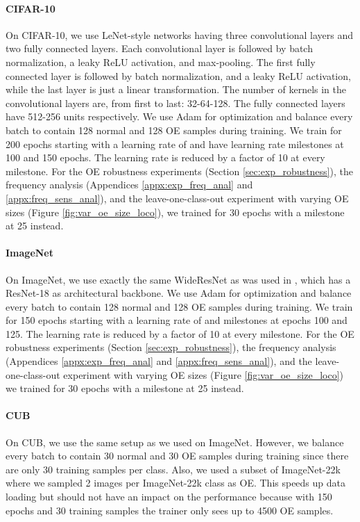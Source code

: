 \documentclass[10pt]{article} \usepackage[accepted]{stylefiles/tmlr}
\begin{document}
\paragraph{CIFAR-10}
On CIFAR-10, we use LeNet-style networks having three convolutional layers and two fully connected layers. Each convolutional layer is followed by batch normalization, a leaky ReLU activation, and max-pooling. The first fully connected layer is followed by batch normalization, and a leaky ReLU activation, while the last layer is just a linear transformation. The number of kernels in the convolutional layers are, from first to last: 32-64-128. The fully connected layers have 512-256 units respectively.
We use Adam \citep{kingma2014} for optimization and balance every batch to contain
128 normal and 128 OE samples during training.
We train for 200 epochs starting with a learning rate of  and have learning rate milestones at 100 and 150 epochs. The learning rate is reduced by a factor of 10 at every milestone.
For the OE robustness experiments (Section \ref{sec:exp_robustness}), the frequency analysis (Appendices \ref{appx:exp_freq_anal} and \ref{appx:freq_sens_anal}), and the leave-one-class-out experiment with varying OE sizes (Figure \ref{fig:var_oe_size_loco}), we trained for 30 epochs with a milestone at 25 instead. 

\paragraph{ImageNet}
On ImageNet, we use exactly the same WideResNet \citep{zagoruyko2016wide} as was used in \citet{hendrycks2019using}, which has a ResNet-18 as architectural backbone.
We use Adam \citep{kingma2014} for optimization and balance every batch to contain
128 normal and 128 OE samples during training.
We train for 150 epochs starting with a learning rate of  and milestones at epochs 100 and 125. The learning rate is reduced by a factor of 10 at every milestone.
For the OE robustness experiments (Section \ref{sec:exp_robustness}), the frequency analysis (Appendices \ref{appx:exp_freq_anal} and \ref{appx:freq_sens_anal}), and the leave-one-class-out experiment with varying OE sizes (Figure \ref{fig:var_oe_size_loco}) we trained for 30 epochs with a milestone at 25 instead. 


\paragraph{CUB}
On CUB, we use the same setup as we used on ImageNet.
However, we balance every batch to contain 30 normal and 30 OE samples during training since there are only 30 training samples per class.
Also, we used a subset of ImageNet-22k where we sampled 2 images per ImageNet-22k class as OE. 
This speeds up data loading but should not have an impact on the performance because with 150 epochs and 30 training samples the trainer only sees up to 4500 OE samples. 
\end{document}
